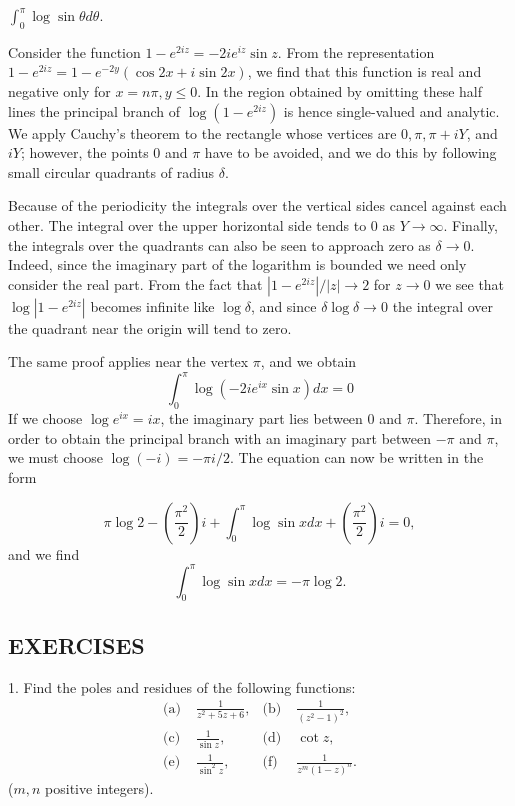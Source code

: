 $\int_0^\pi \log \sin \theta d\theta .$

Consider the function $1 - e^{2iz} = -2ie^{iz} \sin z$. From the representation $1 - e^{2iz} = 1 - e^{-2y} (\cos 2x + i \sin 2x)$, we find that this function is real and negative only for $x = n\pi, y \leq 0$. In the region obtained by omitting these half lines the principal branch of $\log (1 - e^{2iz})$ is hence single-valued and analytic. We apply Cauchy's theorem to the rectangle whose vertices are $0, \pi, \pi + iY$, and $iY$; however, the points 0 and $\pi$ have to be avoided, and we do this by following small circular quadrants of radius $\delta$.

Because of the periodicity the integrals over the vertical sides cancel against each other. The integral over the upper horizontal side tends to 0 as $Y \to \infty$. Finally, the integrals over the quadrants can also be seen to approach zero as $\delta \to 0$. Indeed, since the imaginary part of the logarithm is bounded we need only consider the real part. From the fact that $|1 - e^{2iz}| / |z| \to 2$ for $z \to 0$ we see that $\log |1 - e^{2iz}|$ becomes infinite like $\log \delta$, and since $\delta \log \delta \to 0$ the integral over the quadrant near the origin will tend to zero.

The same proof applies near the vertex $\pi$, and we obtain
\begin{equation*}
\int_ {0} ^ {\pi} \log (- 2 i e ^ {i x} \sin x) d x = 0
\end{equation*}
If we choose $\log e^{ix} = ix$, the imaginary part lies between 0 and $\pi$. Therefore, in order to obtain the principal branch with an imaginary part between $-\pi$ and $\pi$, we must choose $\log (-i) = -\pi i/2$. The equation can now be written in the form


\begin{equation*}
\pi \log 2 - \left(\frac {\pi^ {2}}{2}\right) i + \int_ {0} ^ {\pi} \log \sin x d x + \left(\frac {\pi^ {2}}{2}\right) i = 0,
\end{equation*}
and we find
\begin{equation*}
\int_ {0} ^ {\pi} \log \sin x d x = - \pi \log 2.
\end{equation*}
\subsection*{EXERCISES}
1. Find the poles and residues of the following functions:
\begin{equation*}
\begin{aligned}
\text{(a)}\;&\frac{1}{z^{2}+5z+6}, & \text{(b)}\;&\frac{1}{(z^{2}-1)^{2}},\\
\text{(c)}\;&\frac{1}{\sin z}, & \text{(d)}\;&\cot z,\\
\text{(e)}\;&\frac{1}{\sin^{2}z}, & \text{(f)}\;&\frac{1}{z^{m}(1-z)^{n}}.
\end{aligned}
\end{equation*}
($m,n$ positive integers).

